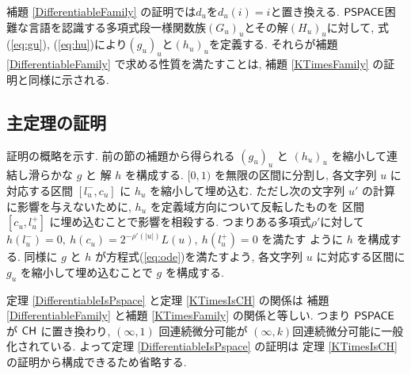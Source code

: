  補題 \ref{DifferentiableFamily} の証明では$d_u$を$d_u(i) = i$と置き換える.
 $\mathsf{PSPACE}$困難な言語を認識する多項式段一様関数族$(G_u)_u$とその解$(H_u)_u$に対して,
 式(\ref{eq:gu}), (\ref{eq:hu})により$(g_u)_u$と$(h_u)_u$を定義する.
 それらが補題 \ref{DifferentiableFamily} で求める性質を満たすことは,
 補題 \ref{KTimesFamily} の証明と同様に示される.


\subsection{主定理の証明}
\label{subsection: proof of theorems}

 証明の概略を示す.
 前の節の補題から得られる $(g_u)_u$ と $(h_u)_u$ を縮小して連結し滑らかな $g$ と
 解 $h$ を構成する.
 $[0,1)$ を無限の区間に分割し, 各文字列 $u$ に対応する区間
 $[l^-_u, c_u]$ に $h_u$ を縮小して埋め込む. 
 ただし次の文字列 $u'$ の計算に影響を与えないために,
 $h_u$ を定義域方向について反転したものを
 区間 $[c_u, l^+_u]$ に埋め込むことで影響を相殺する.
 つまりある多項式$\rho'$に対して
 $h(l^-_u) = 0,\ h(c_u) = 2^{-\rho'(|u|)} L(u),\ h(l^+_u) = 0$ を満たす
 ように $h$ を構成する.
 同様に $g$ と $h$ が方程式(\ref{eq:ode})を満たすよう,
 各文字列 $u$ に対応する区間に $g_u$ を縮小して埋め込むことで $g$ を構成する.

 定理 \ref{DifferentiableIsPspace} と定理 \ref{KTimesIsCH} の関係は
 補題 \ref{DifferentiableFamily} と補題 \ref{KTimesFamily} の関係と等しい.
 つまり $\mathsf{PSPACE}$ が $\mathsf{CH}$ に置き換わり,
 $(\infty, 1)$ 回連続微分可能が $(\infty, k)$回連続微分可能に一般化されている.
 よって定理 \ref{DifferentiableIsPspace} の証明は
 定理 \ref{KTimesIsCH} の証明から構成できるため省略する.



